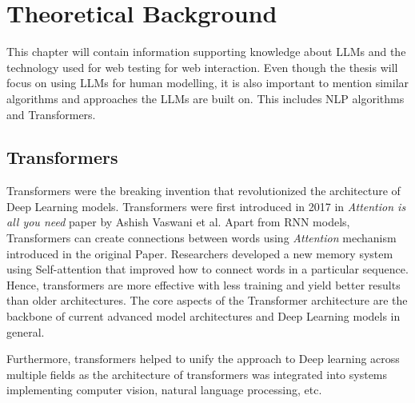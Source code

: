 \chapter{Theoretical Background}
\label{tb}

This chapter will contain information supporting knowledge about LLMs and the technology used for web testing for web interaction. Even though the thesis will focus on using LLMs for human modelling, it is also important to mention similar algorithms and approaches the LLMs are built on. This includes NLP algorithms and Transformers.





\section{Transformers}

Transformers were the breaking invention that revolutionized the architecture of Deep Learning models. Transformers were first introduced in 2017 in \textit{Attention is all you need} paper \cite{attention} by Ashish Vaswani et al. Apart from RNN models, Transformers can create connections between words using \textit{Attention} mechanism introduced in the original Paper. Researchers developed a new memory system using Self-attention that improved how to connect words in a particular sequence. Hence, transformers are more effective with less training and yield better results than older architectures. The core aspects of the Transformer architecture are the backbone of current advanced model architectures and Deep Learning models in general.

Furthermore, transformers helped to unify the approach to Deep learning across multiple fields as the architecture of transformers was integrated into systems implementing computer vision, natural language processing, etc. 

